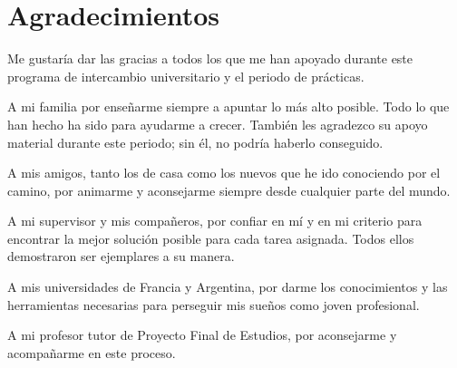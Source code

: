 \chapter*{Agradecimientos}

Me gustaría dar las gracias a todos los que me han apoyado durante este programa de intercambio universitario y el periodo de prácticas.

A mi familia por enseñarme siempre a apuntar lo más alto posible. Todo lo que han hecho ha sido para ayudarme a crecer. También les agradezco su apoyo material durante este periodo; sin él, no podría haberlo conseguido.

A mis amigos, tanto los de casa como los nuevos que he ido conociendo por el camino, por animarme y aconsejarme siempre desde cualquier parte del mundo.

A mi supervisor y mis compañeros, por confiar en mí y en mi criterio para encontrar la mejor solución posible para cada tarea asignada. Todos ellos demostraron ser ejemplares a su manera.

A mis universidades de Francia y Argentina, por darme los conocimientos y las herramientas necesarias para perseguir mis sueños como joven profesional.

A mi profesor tutor de Proyecto Final de Estudios, por aconsejarme y acompañarme en este proceso.